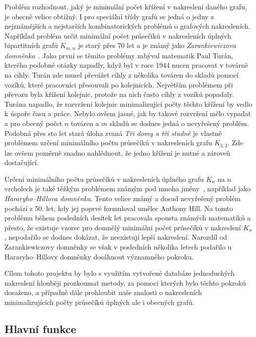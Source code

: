 \documentclass{article}
\begin{document}
Problém rozhodnout, jaký je minimální počet křížení v nakreslení daného grafu, je obecně velice obtížný.
I pro speciální třídy grafů se jedná o jedny z nejznámějších a nejstarších kombinatorických problémů o grafových nakresleních.
Například problém určit minimální počet průsečíků v nakresleních
úpl\-ných bipartitních grafů $K_{m,n}$ je starý přes 70 let a je známý jako \emph{Zarankiewiczova domněnka}~\cite{history}.
Jako první se těmito problémy zabýval matematik Paul Turán, kterého podobné otázky napadly, když byl v roce 1944 nucen pracovat v továrně na cihly.
Turán zde musel převážet cihly z několika továren do skladů pomocí vozíků, které pracovníci přesouvali po kolejnicích.
Největším problémem při převozu byla křížení kolejnic, protože na nich často cihly z vozíků popadaly.
Turána napadlo, že rozvržení kolejnic minimalizující počty těchto křížení by vedlo k úspoře času a práce.
Nebylo ovšem jasné, jak by takové rozvržení mělo vypadat a pro obecný počet $n$ továren a $m$ skladů se dodnes jedná o nevyřešený problém.
Podobná přes sto let stará úloha zvaná \emph{Tři domy a tři studně} je vlastně problémem určení minimálního počtu průsečíků v nakresleních grafu $K_{3, 3}$.
Zde lze ovšem poměrně snadno nahlédnout, že jedno křížení je nutné a zároveň dostačující.

Určení minimálního počtu průsečíků v nakresleních úplného grafu $K_n$ na $n$ vrcholech je také těžkým problémem známým pod mnoha jmény~\cite{history}, například jako \emph{Hararyho--Hillova domněnka}.
Tento velice známý a dosud nevyřešený pro\-blém pochází z 50. let, kdy jej poprvé formuloval umělec Anthony Hill.
Na tomto problému během posledních desítek let pracovala spousta známých matematiků a přesto, že existuje vzorec pro domnělý minimální počet průsečíků v nakreslení $K_n$, 
nepodařilo se dodnes dokázat, že neexistují lepší nakreslení.
Narozdíl od Zarankiewiczovy domněnky se však v posledních několika letech podařilo u Hararyho--Hillovy domněnky dosáhnout významného pokroku.

Cílem tohoto projektu by bylo s využitím vytvořené databáze jednoduchých nakreslení hlouběji prozkoumat metody, za pomoci kterých bylo těchto pokroků dosaženo, a případně dále
prohloubit naše znalosti o nakresleních minimalizujících počty průsečíků úplných ale i obecných grafů.

\subsection{Hlavní funkce}
\end{document}
